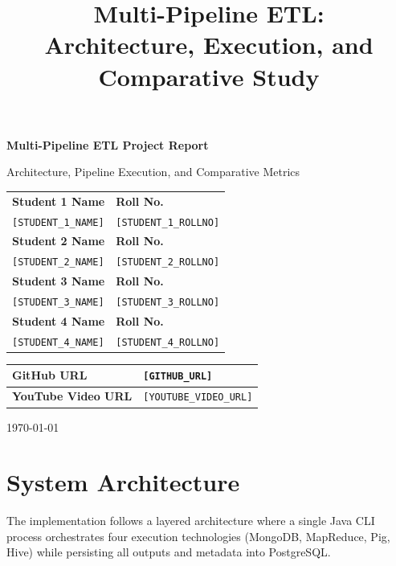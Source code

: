 \documentclass[12pt,a4paper]{article}
\title{Multi-Pipeline ETL:\\Architecture, Execution, and Comparative Study}
\author{}
\date{}
\begin{document}
\begin{titlepage}
  \centering
  {\Large \textbf{Multi-Pipeline ETL Project Report}\par}
  \vspace{0.5cm}
  {\large Architecture, Pipeline Execution, and Comparative Metrics\par}
  \vspace{1.4cm}

  \begin{tabular}{|p{}|p{}|}
    \hline
    \textbf{Student 1 Name} & \textbf{Roll No.} \\
    \texttt{[STUDENT\_1\_NAME]} & \texttt{[STUDENT\_1\_ROLLNO]} \\
    \hline
    \textbf{Student 2 Name} & \textbf{Roll No.} \\
    \texttt{[STUDENT\_2\_NAME]} & \texttt{[STUDENT\_2\_ROLLNO]} \\
    \hline
    \textbf{Student 3 Name} & \textbf{Roll No.} \\
    \texttt{[STUDENT\_3\_NAME]} & \texttt{[STUDENT\_3\_ROLLNO]} \\
    \hline
    \textbf{Student 4 Name} & \textbf{Roll No.} \\
    \texttt{[STUDENT\_4\_NAME]} & \texttt{[STUDENT\_4\_ROLLNO]} \\
    \hline
  \end{tabular}

  \vspace{1.2cm}

  \begin{tabular}{|p{}|p{}|}
    \hline
    \textbf{GitHub URL} & \texttt{[GITHUB\_URL]} \\
    \hline
    \textbf{YouTube Video URL} & \texttt{[YOUTUBE\_VIDEO\_URL]} \\
    \hline
  \end{tabular}

  \vfill
  {\large \today\par}
\end{titlepage}

\section{System Architecture}

The implementation follows a layered architecture where a single Java CLI process orchestrates four execution technologies (MongoDB, MapReduce, Pig, Hive) while persisting all outputs and metadata into PostgreSQL.
\end{document}
